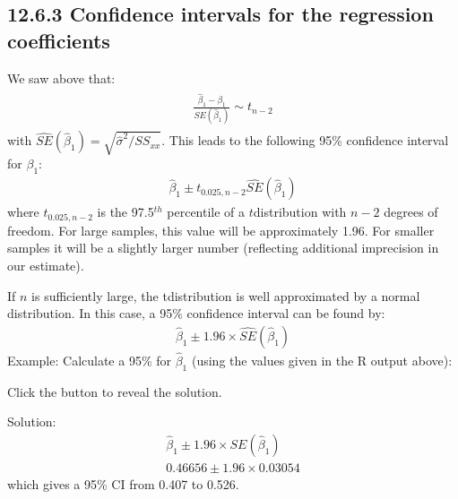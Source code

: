 \documentclass[letterpaper,10pt,english]{jupyterBook}
\begin{document}
\subsection{12.6.3 Confidence intervals for the regression coefficients}
\label{\detokenize{12.g. Linear Regression I:confidence-intervals-for-the-regression-coefficients}}
\sphinxAtStartPar
We saw above that:
\begin{equation*}
\begin{split}
\begin{align}
\frac{\hat{\beta}_1 - \beta_1}{\hat{SE}(\hat{\beta}_1) } \sim t_{n-2}
\end{align}
\end{split}
\end{equation*}
\sphinxAtStartPar
with \(\hat{SE}(\hat{\beta}_1) = \sqrt{\hat{\sigma}^2/SS_{xx}}\). This leads to the following 95\% confidence interval for \(\beta_1\):
\begin{equation*}
\begin{split}
\hat{\beta}_1 \pm t_{0.025, n-2} \hat{SE}(\hat{\beta}_1)
\end{split}
\end{equation*}
\sphinxAtStartPar
where \(t_{0.025, n-2}\) is the 97.5\(^{th}\) percentile of a \(t\)\sphinxhyphen{}distribution with \(n-2\) degrees of freedom. For large samples, this value will be approximately 1.96. For smaller samples it will be a slightly larger number (reflecting additional imprecision in our estimate).

\sphinxAtStartPar
If \(n\) is sufficiently large, the t\sphinxhyphen{}distribution is well approximated by a normal distribution. In this case, a 95\% confidence interval can be found by:
\begin{equation*}
\begin{split}
\hat{\beta}_1 \pm 1.96 \times \hat{SE}(\hat{\beta}_1)
\end{split}
\end{equation*}
\sphinxAtStartPar
Example: Calculate a 95\% for  \(\hat{\beta}_1\)  (using the values given in the R output above):

\sphinxAtStartPar
Click the button to reveal the solution.

\sphinxAtStartPar
Solution:
\begin{equation*}
\begin{split}
\hat{\beta}_1 \pm 1.96 \times SE(\hat{\beta}_1) \\
0.46656 \pm 1.96 \times 0.03054
\end{split}
\end{equation*}
\sphinxAtStartPar
which gives a 95\% CI from 0.407 to 0.526.
\end{document}
